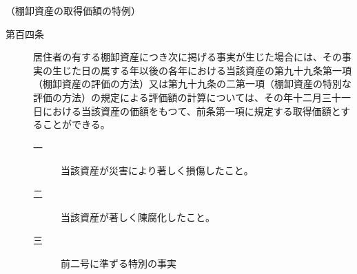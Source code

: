 \documentclass[twocolumn,a4j,10pt]{ltjtarticle}
\begin{document}
\noindent\hspace{10pt}（棚卸資産の取得価額の特例）
\begin{description}
\item[第百四条]居住者の有する棚卸資産につき次に掲げる事実が生じた場合には、その事実の生じた日の属する年以後の各年における当該資産の第九十九条第一項（棚卸資産の評価の方法）又は第九十九条の二第一項（棚卸資産の特別な評価の方法）の規定による評価額の計算については、その年十二月三十一日における当該資産の価額をもつて、前条第一項に規定する取得価額とすることができる。
\begin{description}
\item[一]当該資産が災害により著しく損傷したこと。
\item[二]当該資産が著しく陳腐化したこと。
\item[三]前二号に準ずる特別の事実
\end{description}
\end{description}
\end{document}
